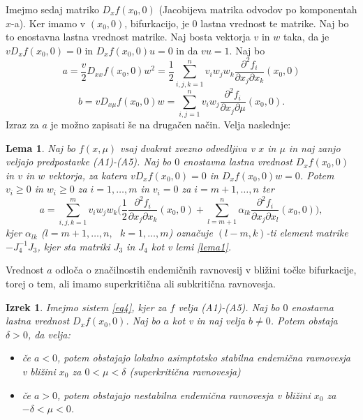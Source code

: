 \documentclass[a4paper,12pt]{article}
\newcommand{\todo}[1]{{\color{red}{#1}}}
\newtheorem{lema}{Lema}
\newtheorem{izrek}{Izrek}
\begin{document}
Imejmo sedaj matriko \(D_xf(x_0,0)\) (Jacobijeva matrika odvodov po komponentah \(x\)-a). 
Ker imamo v \((x_0,0)\), bifurkacijo, je \(0\) lastna vrednost te matrike. Naj bo 
to enostavna lastna vrednost matrike. Naj bosta vektorja \(v\) in \(w\) taka, da je 
\(vD_xf(x_0,0)=0\) in \(D_xf(x_0,0)u=0\) in da \(vu=1\).
Naj bo 
\begin{equation}\label{eq5}
a=\frac{v}{2}D_{xx}f(x_0,0)w^2=\frac{1}{2}\sum_{i,j,k=1}^n v_iw_jw_k\frac{\partial^2f_i}{\partial x_j \partial x_k}(x_0,0)
\end{equation}
\[b=vD_{x\mu}f(x_0,0)w=\sum_{i,j=1}^n v_i w_j \frac{\partial^2 f_i}{\partial x_j \partial \mu}(x_0,0).\]
Izraz za \(a\) je možno zapisati še na drugačen način. Velja naslednje:

\begin{lema}\label{lema2}
    Naj bo \(f(x,\mu)\) vsaj dvakrat zvezno odvedljiva v 
    \(x\) in \(\mu\) in naj zanjo veljajo predpostavke (A1)-(A5).
    Naj bo \(0\) enostavna lastna vrednost \(D_xf(x_0,0)\) in \(v\) in \(w\)
    vektorja, za katera \(vD_xf(x_0,0)=0\) in \(D_xf(x_0,0)w=0\). 
    Potem \(v_i\geq 0\) in \(w_i\geq 0\) za \(i=1,\ldots, m\) in 
    \(v_i=0\) za \(i=m+1,\ldots,n\) ter 
    \[a=\sum_{i,j,k=1}^m v_i w_j w_k \big(\frac{1}{2}\frac{\partial^2 f_i}{\partial x_j \partial x_k}(x_0,0)+\sum_{l=m+1}^n \alpha_{lk}\frac{\partial^2 f_i}{\partial x_j \partial x_l}(x_0,0)\big),\]
    kjer \(\alpha_{lk}\) (\(l=m+1,\ldots,n,\textrm{ }k=1,\ldots,m\)) označuje 
    \((l-m,k)\)-ti element matrike \(-J_4^{-1}J_3\), kjer sta matriki \(J_3\) in \(J_4\)
    kot v lemi \ref{lema1}.
\end{lema}

\todo{dokaz:izpusti}

Vrednost \(a\) odloča o značilnostih endemičnih ravnovesij v bližini točke bifurkacije, 
torej o tem, ali imamo superkritična ali subkritična ravnovesja. 

\begin{izrek}\label{izrek2}
    Imejmo sistem \ref{eq4}, kjer za \(f\) velja (A1)-(A5). Naj bo \(0\) enostavna
    lastna vrednost \(D_xf(x_0,0)\). Naj bo \(a\) kot v \label{eq5} in naj velja \(b\neq 0\).
    Potem obstaja \(\delta >0\), da velja:
    \begin{itemize}
        \item če \(a<0\), potem obstajajo lokalno asimptotsko stabilna endemična ravnovesja
        v bližini \(x_0\) za \(0<\mu <\delta\) (superkritična ravnovesja)
        \item če \(a>0\), potem obstajajo nestabilna endemična ravnovesja v bližini \(x_0\) 
        za \(-\delta < \mu < 0\).
    \end{itemize}
\end{izrek}
\end{document}

